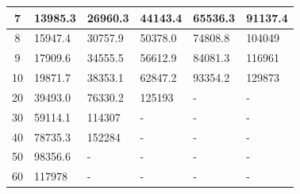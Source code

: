 \begin{table}[htp]
\begin{tabular}{|c|l|l|l|l|l|}
7                                                                          & 13985.3                              & 26960.3                               & 44143.4                               & 65536.3                               & 91137.4                               \\ \hline
8                                                                          & 15947.4                              & 30757.9                               & 50378.0                               & 74808.8                               & 104049                                \\ \hline
9                                                                          & 17909.6                              & 34555.5                               & 56612.9                               & 84081.3                               & 116961                                \\ \hline
10                                                                         & 19871.7                              & 38353.1                               & 62847.2                               & 93354.2                               & 129873                                \\ \hline
20                                                                         & 39493.0                              & 76330.2                               & 125193                                & -                                     & -                                     \\ \hline
30                                                                         & 59114.1                              & 114307                                & -                                     & -                                     & -                                     \\ \hline
40                                                                         & 78735.3                              & 152284                                & -                                     & -                                     & -                                     \\ \hline
50                                                                         & 98356.6                              & -                                     & -                                     & -                                     & -                                     \\ \hline
60                                                                         & 117978                               & -                                     & -                                     & -                                     & -                                     \\ \hline

\end{tabular}
\end{table}
